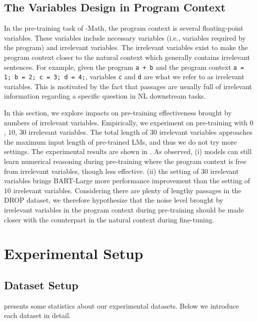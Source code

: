 \subsection{The Variables Design in Program Context}

In the pre-training task of \ours-Math, the program context is several floating-point variables.
These variables include necessary variables (i.e., variables required by the program) and irrelevant variables.
The irrelevant variables exist to make the program context closer to the natural context which generally contains irrelevant sentences.
For example, given the program \texttt{\small a + b} and the program context \texttt{\small a = 1; b = 2; c = 3; d = 4;}, variables \texttt{\small c} and \texttt{\small d} are what we refer to as irrelevant variables.
This is motivated by the fact that passages are usually full of irrelevant information regarding a specific question in NL downstream tasks.

In this section, we explore impacts on pre-training effectiveness brought by numbers of irrelevant variables.
Empirically, we experiment on pre-training with $0$, $10$, $30$ irrelevant variables.
The total length of $30$ irrelevant variables approaches the maximum input length of pre-trained LMs, and thus we do not try more settings.
The experimental results are shown in .
As observed, (i) models can still learn numerical reasoning during pre-training where the program context is free from irrelevant variables, though less effective. (ii) the setting of $30$ irrelevant variables brings BART-Large more performance improvement than the setting of $10$ irrelevant variables.
Considering there are plenty of lengthy passages in the DROP dataset, we therefore hypothesize that the noise level brought by irrelevant variables in the program context during pre-training should be made closer with the counterpart in the natural context during fine-tuning.

\section{Experimental Setup}\label{sec:append_dataset}

\subsection{Dataset Setup}

 presents some statistics about our experimental datasets.
Below we introduce each dataset in detail.

